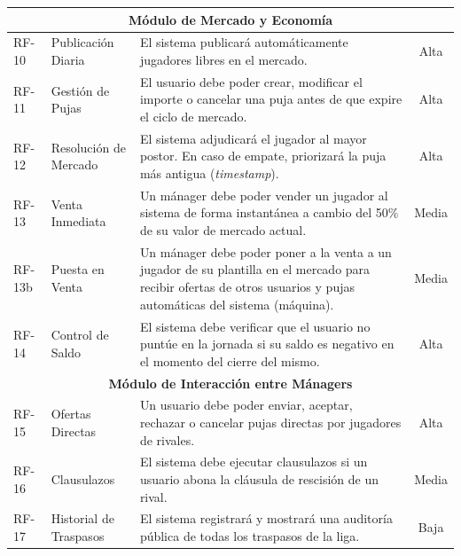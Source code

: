 \begin{center}
\begin{longtable}{|l|p{3.5cm}|p{7cm}|c|}
    \multicolumn{4}{|c|}{\textbf{Módulo de Mercado y Economía}} \\
    \hline
    RF-10 & Publicación Diaria & El sistema publicará automáticamente jugadores libres en el mercado. & Alta \\ \hline
    RF-11 & Gestión de Pujas & El usuario debe poder crear, modificar el importe o cancelar una puja antes de que expire el ciclo de mercado. & Alta \\ \hline
    RF-12 & Resolución de Mercado & El sistema adjudicará el jugador al mayor postor. En caso de empate, priorizará la puja más antigua (\textit{timestamp}). & Alta \\ \hline
    RF-13 & Venta Inmediata & Un mánager debe poder vender un jugador al sistema de forma instantánea a cambio del 50\% de su valor de mercado actual. & Media \\ \hline
    RF-13b & Puesta en Venta & Un mánager debe poder poner a la venta a un jugador de su plantilla en el mercado para recibir ofertas de otros usuarios y pujas automáticas del sistema (máquina). & Media \\ \hline
    RF-14 & Control de Saldo & El sistema debe verificar que el usuario no puntúe en la jornada si su saldo es negativo en el momento del cierre del mismo. & Alta \\ \hline
    
    \multicolumn{4}{|c|}{\textbf{Módulo de Interacción entre Mánagers}} \\
    \hline
    RF-15 & Ofertas Directas & Un usuario debe poder enviar, aceptar, rechazar o cancelar pujas directas por jugadores de rivales. & Alta \\ \hline
    RF-16 & Clausulazos & El sistema debe ejecutar clausulazos si un usuario abona la cláusula de rescisión de un rival. & Media \\ \hline
    RF-17 & Historial de Traspasos & El sistema registrará y mostrará una auditoría pública de todas los traspasos de la liga. & Baja \\ \hline
    

\end{longtable}
\end{center}
